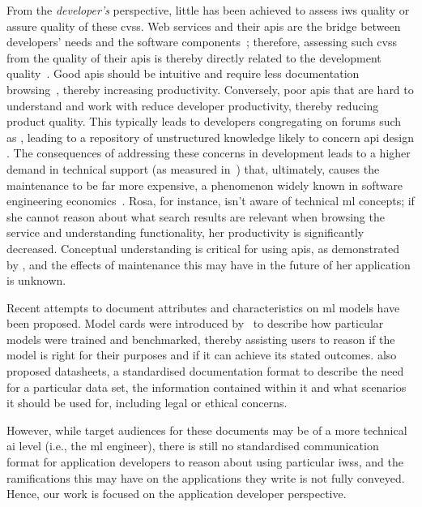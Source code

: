 From the \textit{developer's} perspective, little has been achieved to assess \gls{iws} quality or assure quality of these \glspl{cvs}. Web services and their \glspl{api} are the bridge between developers' needs and the software components~\citep{Arnold:2005vc}; therefore, assessing such \glspl{cvs} from the quality of their \glspl{api} is thereby directly related to the development quality~\citep{Ko:2004td}. Good \glspl{api} should be intuitive and require less documentation browsing~\citep{Piccioni:2013em}, thereby increasing productivity. Conversely, poor \glspl{api} that are hard to understand and work with reduce developer productivity, thereby reducing product quality. This typically leads to developers congregating on forums such as , leading to a repository of unstructured knowledge likely to concern \gls{api} design \citep{7180082}. The consequences of addressing these concerns in development leads to a higher demand in technical support (as measured in~\citep{Henning:2009hz}) that, ultimately, causes the maintenance to be far more expensive, a phenomenon widely known in software engineering economics~\citep{Boehm:1981ua}. Rosa, for instance, isn't aware of technical \gls{ml} concepts; if she cannot reason about what search results are relevant when browsing the service and understanding functionality, her productivity is significantly decreased. Conceptual understanding is critical for using \glspl{api}, as demonstrated by \citeauthor{Ko:2011fb}, and the effects of maintenance this may have in the future of her application is unknown.

Recent attempts to document attributes and characteristics on \gls{ml} models have been proposed. Model cards were introduced by~\citet{Mitchell:2018in} to describe how particular models were trained and benchmarked, thereby assisting users to reason if the model is right for their purposes and if it can achieve its stated outcomes. \citet{Gebru:2018wh} also proposed datasheets, a standardised documentation format to describe the need for a particular data set, the information contained within it and what scenarios it should be used for, including legal or ethical concerns. 

However, while target audiences for these documents may be of a more technical \gls{ai} level (i.e., the \gls{ml} engineer), there is still no standardised communication format for application developers to reason about using particular \glspl{iws}, and the ramifications this may have on the applications they write is not fully conveyed. Hence, our work is focused on the application developer perspective. 

